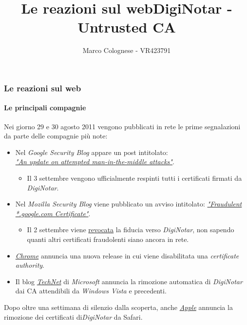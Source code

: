 \documentclass{beamer}
\begin{document}
\begin{frame}
\begin{multicols}{2}
\begin{figure}[H]
\end{figure}
\end{multicols}
\end{frame}


\title{Le reazioni sul web}
\subtitle{}
\institute{}
\author{}
\begin{frame}
\titlepage
\end{frame}
\title{DigiNotar - Untrusted CA}
\author{Marco Colognese - VR423791}

\begin{frame}
\frametitle{Le reazioni sul web}
\framesubtitle{Le principali compagnie}
Nei giorno 29 e 30 agosto 2011 vengono pubblicati in rete le prime segnalazioni da parte delle compagnie più note:
\begin{itemize}
	\item Nel \textit{\alert{Google Security Blog}} appare un post intitolato:\\ \href{https://security.googleblog.com/2011/08/update-on-attempted-man-in-middle.html}{\textit{"An update on attempted man-in-the-middle attacks"}}.
	\begin{itemize}
		\item Il 3 settembre vengono ufficialmente \alert{respinti} tutti i \alert{certificati} firmati da \textit{DigiNotar}.
	\end{itemize}

	\item Nel \textit{\alert{Mozilla Security Blog}} viene pubblicato un avviso intitolato: \href{https://blog.mozilla.org/security/2011/08/29/fraudulent-google-com-certificate/}{\textit{"Fraudulent *.google.com Certificate"}}.
	\begin{itemize}
		\item Il 2 settembre viene \href{https://blog.mozilla.org/security/2011/09/02/diginotar-removal-follow-up/}{\alert{revocata}} la \alert{fiducia} verso \textit{DigiNotar}, non sapendo quanti altri certificati fraudolenti siano ancora in rete.
	\end{itemize}

	\item \href{https://chromereleases.googleblog.com/2011/08/stable-update.html}{\textit{\alert{Chrome}}} annuncia una nuova release in cui viene \alert{disabilitata} una \alert{\textit{certificate authority}}.
	
	\item Il blog \href{https://blogs.technet.microsoft.com/msrc/2011/08/29/microsoft-releases-security-advisory-2607712/}{\textit{\alert{TechNet}}} di \textit{\alert{Microsoft}} annuncia la rimozione automatica di \textit{DigiNotar} dai CA attendibili da \textit{Windows Vista} e precedenti.
	
\end{itemize}
\noindent
Dopo oltre una settimana di silenzio dalla scoperta, anche \href{https://support.apple.com/it-it/HT4920}{\textit{\alert{Apple}}} annuncia la \alert{rimozione} dei certificati di\textit{DigiNotar} \alert{da Safari}.
\\~\\
\end{frame}
\end{document}
